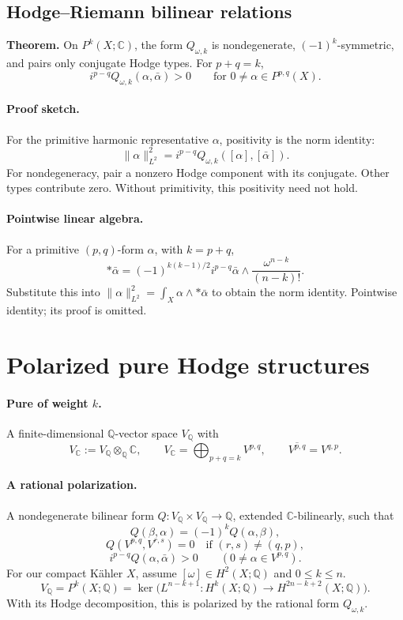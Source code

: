 \documentclass[11pt]{article}
\newcommand{\C}{\mathbb C}
\newcommand{\Q}{\mathbb Q}
\begin{document}
\subsection*{Hodge--Riemann bilinear relations}
\textbf{Theorem.} On $P^k(X;\C)$, the form $Q_{\omega,k}$ is
nondegenerate, $(-1)^k$-symmetric, and pairs only conjugate Hodge types.
For $p+q=k$,
\[
 i^{p-q}Q_{\omega,k}(\alpha,\bar\alpha)>0
 \qquad\text{for }0\neq\alpha\in P^{p,q}(X).
\]
\paragraph{Proof sketch.}
For the primitive harmonic representative $\alpha$, positivity is the
norm identity:
\[
 \|\alpha\|_{L^2}^2
 =i^{p-q}Q_{\omega,k}([\alpha],[\bar\alpha]).
\]
For nondegeneracy, pair a nonzero Hodge component with its conjugate.
Other types contribute zero. Without primitivity, this positivity need
not hold.

\paragraph{Pointwise linear algebra.}
For a primitive $(p,q)$-form $\alpha$, with $k=p+q$,
\[
 *\bar\alpha=(-1)^{k(k-1)/2}i^{p-q}\bar\alpha
 \wedge\frac{\omega^{n-k}}{(n-k)!}.
\]
Substitute this into
$\|\alpha\|_{L^2}^2=\int_X\alpha\wedge *\bar\alpha$
to obtain the norm identity. Pointwise identity; its proof is omitted.

\section*{Polarized pure Hodge structures}
\paragraph{Pure of weight $k$.}
A finite-dimensional $\Q$-vector space $V_{\Q}$ with
\[
 V_{\C}:=V_{\Q}\otimes_{\Q}\C,\qquad
 V_{\C}=\bigoplus_{p+q=k}V^{p,q},\qquad
 \overline{V^{p,q}}=V^{q,p}.
\]
\paragraph{A rational polarization.}
A nondegenerate bilinear form $Q:V_{\Q}\times V_{\Q}\longrightarrow\Q$,
extended $\C$-bilinearly, such that
\[
 Q(\beta,\alpha)=(-1)^kQ(\alpha,\beta),
\]
\[
 Q(V^{p,q},V^{r,s})=0\quad\text{if }(r,s)\neq(q,p),
\]
\[
 i^{p-q}Q(\alpha,\bar\alpha)>0\qquad(0\neq\alpha\in V^{p,q}).
\]
For our compact K\"ahler $X$, assume $[\omega]\in H^2(X;\Q)$ and
$0\leq k\leq n$.
\[
 V_{\Q}=P^k(X;\Q)
 =\ker\bigl(L^{n-k+1}:H^k(X;\Q)\longrightarrow H^{2n-k+2}(X;\Q)\bigr).
\]
With its Hodge decomposition, this is polarized by the rational form
$Q_{\omega,k}$.
\end{document}
